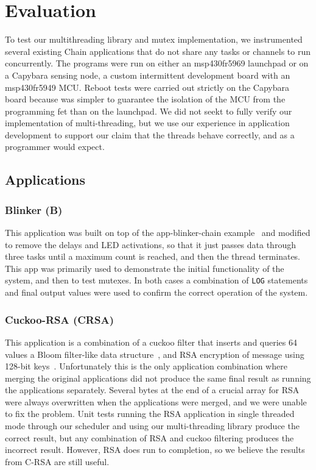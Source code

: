 \documentclass[11pt]{sensys-proc}
\begin{document}


\section{Evaluation}
To test our multithreading library and mutex implementation, we instrumented
several existing Chain applications that do not share any tasks or channels to
run concurrently. The programs were run on either an msp430fr5969 launchpad or
on a Capybara sensing node, a custom intermittent development board with an
msp430fr5949 MCU. Reboot tests were carried out strictly on the Capybara board
because was simpler to guarantee the isolation of the MCU from the programming
fet than on the launchpad. We did not seekt to fully verify our implementation
of multi-threading, but we use our experience in application development to
support our claim that the threads behave correctly, and as a programmer would
expect. 
\subsection{Applications}
\subsubsection{Blinker (B)}
This application was built on top of the app-blinker-chain
example~\cite{blinker} and modified to remove the delays and LED activations, so
that it just passes data through three tasks until a maximum count is reached,
and then the thread terminates. This app was primarily used to demonstrate the
initial functionality of the system, and then to test mutexes. In both cases a
combination of \texttt{LOG} statements and final output values were used to
confirm the correct operation of the system. 
\subsubsection{Cuckoo-RSA (CRSA)}
This application is a combination of a cuckoo filter that inserts and queries 64
values a Bloom filter-like data structure~\cite{Chain}, and RSA encryption of message
using 128-bit keys~\cite{Chain}. Unfortunately this is the only application
combination where merging the original applications did not produce the same
final result as running the applications separately. Several bytes at the end of
a crucial array for RSA were always overwritten when the applications were
merged, and we were unable to fix the problem. Unit tests running the RSA
application in single threaded mode through our scheduler and using our
multi-threading library produce the correct result, but any combination of RSA
and cuckoo filtering produces the incorrect result. However, RSA does run to
completion, so we believe the results from C-RSA are still useful. 
\end{document}

